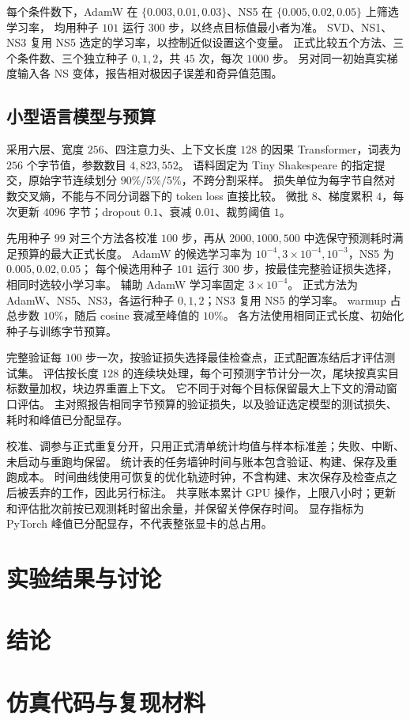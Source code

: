 \documentclass[UTF8,a4paper,11pt]{ctexart}
\begin{document}
每个条件数下，AdamW 在 $\{0.003,0.01,0.03\}$、NS5 在 $\{0.005,0.02,0.05\}$ 上筛选学习率，
均用种子 $101$ 运行 $300$ 步，以终点目标值最小者为准。
SVD、NS1、NS3 复用 NS5 选定的学习率，以控制近似设置这个变量。
正式比较五个方法、三个条件数、三个独立种子 $0,1,2$，共 $45$ 次，每次 $1000$ 步。
另对同一初始真实梯度输入各 NS 变体，报告相对极因子误差和奇异值范围。

\subsection{小型语言模型与预算}
采用六层、宽度 $256$、四注意力头、上下文长度 $128$ 的因果 Transformer，词表为 $256$ 个字节值，参数数目 $4,823,552$。
语料固定为 Tiny Shakespeare 的指定提交，原始字节连续划分 $90\%/5\%/5\%$，不跨分割采样。
损失单位为每字节自然对数交叉熵，不能与不同分词器下的 token loss 直接比较。
微批 $8$、梯度累积 $4$，每次更新 $4096$ 字节；dropout $0.1$、衰减 $0.01$、裁剪阈值 $1$。

先用种子 $99$ 对三个方法各校准 $100$ 步，再从 $2000,1000,500$ 中选保守预测耗时满足预算的最大正式长度。
AdamW 的候选学习率为 $10^{-4},3\times10^{-4},10^{-3}$，NS5 为 $0.005,0.02,0.05$；
每个候选用种子 $101$ 运行 $300$ 步，按最佳完整验证损失选择，相同时选较小学习率。
辅助 AdamW 学习率固定 $3\times10^{-4}$。
正式方法为 AdamW、NS5、NS3，各运行种子 $0,1,2$；NS3 复用 NS5 的学习率。
warmup 占总步数 $10\%$，随后 cosine 衰减至峰值的 $10\%$。
各方法使用相同正式长度、初始化种子与训练字节预算。

完整验证每 $100$ 步一次，按验证损失选择最佳检查点，正式配置冻结后才评估测试集。
评估按长度 $128$ 的连续块处理，每个可预测字节计分一次，尾块按真实目标数量加权，块边界重置上下文。
它不同于对每个目标保留最大上下文的滑动窗口评估。
主对照报告相同字节预算的验证损失，以及验证选定模型的测试损失、耗时和峰值已分配显存。

校准、调参与正式重复分开，只用正式清单统计均值与样本标准差；失败、中断、未启动与重跑均保留。
统计表的任务墙钟时间与账本包含验证、构建、保存及重跑成本。
时间曲线使用可恢复的优化轨迹时钟，不含构建、末次保存及检查点之后被丢弃的工作，因此另行标注。
共享账本累计 GPU 操作，上限八小时；更新和评估批次前按已观测耗时留出余量，并保留关停保存时间。
显存指标为 PyTorch 峰值已分配显存，不代表整张显卡的总占用。

\section{实验结果与讨论}

\section{结论}

\section*{仿真代码与复现材料}



\end{document}

